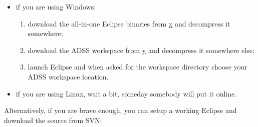 \documentclass{memoir}
\begin{document}
	\begin{itemize}
		\item if you are using Windows:
		\begin{enumerate}
			\item download the all-in-one Eclipse binaries from \url{x} and decompress it somewhere;
			\item download the ADSS workspace from \url{y} and decompress it somewhere else;
			\item launch Eclipse and when asked for the workspace directory choose your ADSS workspace location.
		\end{enumerate}
		\item if you are using Linux, wait a bit, someday somebody will put it online.
	\end{itemize}
	
	Alternatively, if you are brave enough, you can setup a working Eclipse and download the source from SVN:
	
\end{document}
